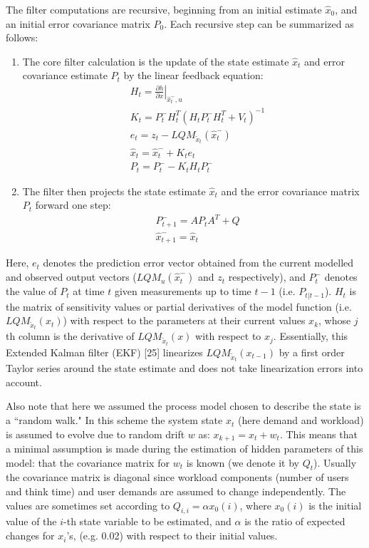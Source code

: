 The filter computations are recursive, beginning from an initial estimate $\hat{x}_0$, and an initial error covariance matrix $P_0$.
Each recursive step can be summarized as follows: 
\begin{enumerate}
\item  The core filter calculation is the update of the state estimate $\hat{x}_t$ and error covariance estimate $P_t$ by the linear feedback equation:
 \begin{align} 
& H_{t} = \left . \frac{\partial h}{\partial x } \right \vert_{\hat{x}_t^-,u} \\
& K_t  =P_t^- H_t^T (H_t P_t^- H_t^T+ V_t )^{-1} \\ 
& e_t   = z_t  - LQM_{\tilde{x}_t}(\hat{x}_t^-)  \label{eq:observation-error} \\  
& \hat{x}_t = \hat{x}_t^- + K_t e_t   \\
& P_t=P_t^- - K_t H_t P_t^-       
 \end{align}
\item The filter then projects the state estimate $\hat{x}_t$ and the error covariance matrix $P_t$ forward one step:  \begin{align}
 & P_{t+1}^-  = AP_tA^T+Q \\
 & \hat{x}_{t+1}^-=\hat{x}_t
 \end{align} 
\end{enumerate}

 Here, $e_t$ denotes the prediction error vector obtained from the current modelled and observed output vectors ($LQM_u(\hat{x}_t^-)$ and $z_t$ respectively), and $P_t^- $ denotes the value of $P_t$  at time $t$ given measurements up to time $t-1$ (i.e. $P_{t|t-1}$).  
 $H_t$ is the matrix of sensitivity values or partial derivatives of the model function (i.e. $LQM_{\tilde{x}_t}(x_t)$) with respect to the parameters at their current values $x_{k}$,  whose $j$th column is the derivative of $LQM_{\tilde{x}_t}(x)$ with respect to $x_j$. 
 Essentially, this Extended Kalman filter (EKF) [25] linearizes $LQM_{\tilde{x}_t}(x_{t-1})$ by a first order Taylor series around the state estimate and does not take linearization errors into account. 

 Also note that here we assumed the process model chosen to describe the state is a ``random walk."  In this scheme the system state  $x_t$ (here demand and workload) is assumed to evolve due to random drift $w$ as: $x_{k+1}= x_t+ w_t$. This means that a minimal assumption is made during the estimation of hidden parameters of this model: that the covariance matrix for $w_t$ is known (we denote it by $Q_t$). 
 Usually the covariance matrix is diagonal since workload components (number of users and think time) and user demands are assumed to change independently. The values are sometimes set according to $Q_{i,i} = \alpha  x_0(i)$, where $x_0(i)$ is the initial value of the $i$-th state variable to be estimated, and $\alpha$ is the ratio of expected changes for $x_i$'s,  (e.g. 0.02) with respect to their initial values.   

